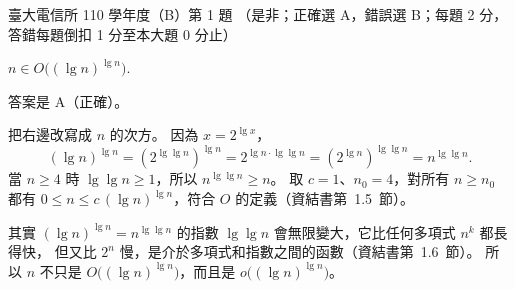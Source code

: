 \begin{pastexam}[label={px:ntu-110-comm-dsa-01}]{臺大電信所 110 學年度（B）第 1 題}
（是非；正確選 A，錯誤選 B；每題 2 分，答錯每題倒扣 1 分至本大題 0 分止）

$n\in O\big((\lg n)^{\lg n}\big)$.
\end{pastexam}

\begin{pastsoln}
答案是 A（正確）。

把右邊改寫成 $n$ 的次方。 因為 $x = 2^{\lg x}$，
\[
(\lg n)^{\lg n} = \left(2^{\lg\lg n}\right)^{\lg n} = 2^{\lg n \cdot \lg\lg n} = \left(2^{\lg n}\right)^{\lg\lg n} = n^{\lg\lg n}.
\]
當 $n \ge 4$ 時 $\lg\lg n \ge 1$，所以 $n^{\lg\lg n} \ge n$。 取 $c = 1$、$n_0 = 4$，對所有
$n \ge n_0$ 都有 $0 \le n \le c\,(\lg n)^{\lg n}$，符合 $O$ 的定義（資結書第~1.5~節）。

其實 $(\lg n)^{\lg n} = n^{\lg\lg n}$ 的指數 $\lg\lg n$ 會無限變大，它比任何多項式 $n^k$ 都長得快，
但又比 $2^n$ 慢，是介於多項式和指數之間的函數（資結書第~1.6~節）。 所以 $n$ 不只是
$O\big((\lg n)^{\lg n}\big)$，而且是 $o\big((\lg n)^{\lg n}\big)$。
\end{pastsoln}
